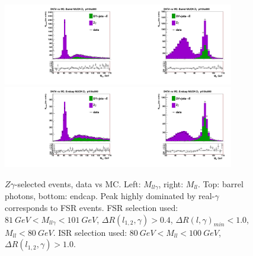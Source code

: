 \begin{figure}[htb]
  \begin{center}
   \includegraphics[width=0.45\textwidth]{../figs/figs_v11/MUON_ZGamma/PrepareYields/c_TotalDATAvsMC_Barrel__MpholeplepVERY_PRELIMINARY_pt15to500_.pdf}\includegraphics[width=0.45\textwidth]{../figs/figs_v11/MUON_ZGamma/PrepareYields/c_TotalDATAvsMC_Barrel__MleplepVERY_PRELIMINARY_pt15to500_.pdf}\\
   \includegraphics[width=0.45\textwidth]{../figs/figs_v11/MUON_ZGamma/PrepareYields/c_TotalDATAvsMC_Endcap__MpholeplepVERY_PRELIMINARY_pt15to500_.pdf}\includegraphics[width=0.45\textwidth]{../figs/figs_v11/MUON_ZGamma/PrepareYields/c_TotalDATAvsMC_Endcap__MleplepVERY_PRELIMINARY_pt15to500_.pdf}\\
  \caption{$Z\gamma$-selected events, data vs MC. Left: $M_{ll\gamma}$, right: $M_{ll}$. Top: barrel photons, bottom: endcap. Peak highly dominated by real-$\gamma$ corresponds to FSR events. FSR selection used: $81~GeV<M_{ll\gamma}<101~GeV$, $\Delta{R}(l_{1,2},\gamma)>0.4$, $\Delta{R}(l,\gamma)_{min}<1.0$, $M_{ll}<80~GeV$. ISR selection used: $80~GeV<M_{ll}<100~GeV$, $\Delta{R}(l_{1,2},\gamma)>1.0$.}
  \label{fig:Zg_Mleplep_and_Mpholeplep}
  \end{center}
\end{figure}

